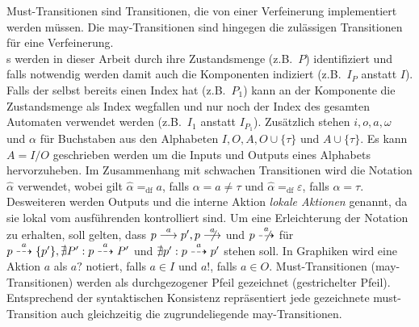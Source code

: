 Must-Transitionen sind Transitionen, die von einer Verfeinerung implementiert
werden müssen. Die may-Transitionen sind hingegen die zulässigen Transitionen
für eine Verfeinerung.\\
\MEIO{}s  werden in dieser Arbeit durch ihre Zustandsmenge (z.B.\ $P$)
identifiziert und falls notwendig werden damit auch die Komponenten indiziert
(z.B.\ $I_P$ anstatt $I$). Falls der \MEIO{} selbst bereits einen Index hat
(z.B.\ $P_1$) kann an der Komponente die Zustandsmenge als Index wegfallen und
nur noch der Index des gesamten Automaten verwendet werden (z.B.\ $I_1$ anstatt
$I_{P_1}$). Zusätzlich stehen $i,o,a,\omega$ und $\alpha$ für Buchstaben aus
den Alphabeten $I,O,A,O\cup\{\tau\}$ und $A\cup\{\tau\}$. Es kann $A=I/O$
geschrieben werden um die Inputs und Outputs eines Alphabets hervorzuheben. Im
Zusammenhang mit schwachen Transitionen wird die Notation $\hat{\alpha}$
verwendet, wobei gilt $\hat{\alpha}=_{\text{df}}a$, falls $\alpha =a\neq\tau$
und $\hat{\alpha}=_{\text{df}}\varepsilon$, falls $\alpha =\tau$. Desweiteren
werden Outputs und die interne Aktion \emph{lokale Aktionen} genannt, da sie
lokal vom ausführenden \MEIO{} kontrolliert sind. Um eine Erleichterung der
Notation zu erhalten, soll gelten, dass $p\must[a]p', p\nmust[a]$ und
$p\nmay[a]$ für $p\may[a]\{p'\}, \nexists P': p\may[a]P'$ und $\nexists p':
p\may[a]p'$ stehen soll. In Graphiken wird eine Aktion $a$ als $a?$ notiert,
falls $a\in I$ und $a!$, falls $a\in O$. Must-Transitionen (may-Transitionen)
werden als durchgezogener %
Pfeil gezeichnet
(gestrichelter Pfeil). Entsprechend der syntaktischen Konsistenz repräsentiert
jede gezeichnete must-Transition auch gleichzeitig die zugrundeliegende
may-Transitionen.


